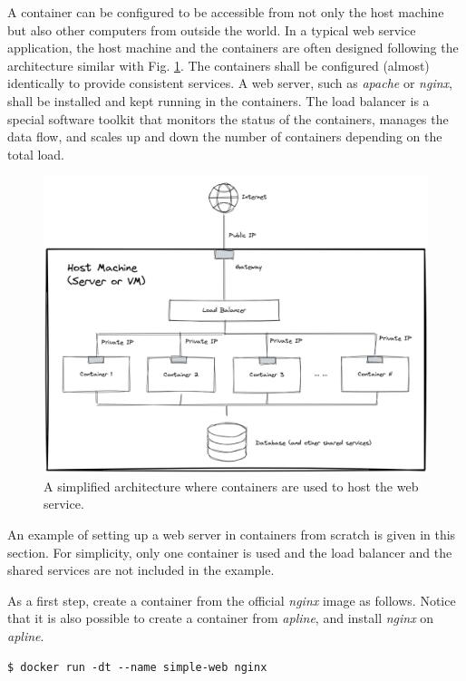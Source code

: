 A container can be configured to be accessible from not only the host machine but also other computers from outside the world. In a typical web service application, the host machine and the containers are often designed following the architecture similar with Fig. \ref{ch:vac:fig:containerwebserverarchitecture}. The containers shall be configured (almost) identically to provide consistent services. A web server, such as \textit{apache} or \textit{nginx}, shall be installed and kept running in the containers. The load balancer is a special software toolkit that monitors the status of the containers, manages the data flow, and scales up and down the number of containers depending on the total load.
\begin{figure}
	\centering
	\includegraphics[width=350pt]{chapters/ch-virtualization-and-containerization/figures/containerwebserverarchitecture.png}
	\caption{A simplified architecture where containers are used to host the web service.} \label{ch:vac:fig:containerwebserverarchitecture}
\end{figure}

An example of setting up a web server in containers from scratch is given in this section. For simplicity, only one container is used and the load balancer and the shared services are not included in the example.

As a first step, create a container from the official \textit{nginx} image as follows. Notice that it is also possible to create a container from \textit{apline}, and install \textit{nginx} on \textit{apline}.
\begin{lstlisting}
$ docker run -dt --name simple-web nginx
\end{lstlisting}

